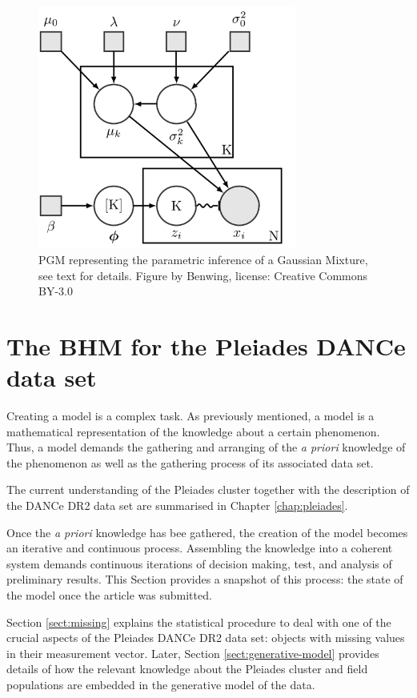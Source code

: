 \begin{figure}[ht!]
\begin{center}
\includegraphics[height=8cm]{background/Figures/BGMM.png}
\caption{PGM representing the parametric inference of a Gaussian Mixture, see text for details. Figure by Benwing, license: Creative Commons BY-3.0}
\label{fig:pgmGMM}
\end{center}
\end{figure}

\section{The BHM for the Pleiades DANCe data set}
\label{sect:datamodelling}
Creating a model is a complex task. As previously mentioned, a model is a mathematical representation of the knowledge about a certain phenomenon. Thus, a model demands the gathering and arranging of the \emph{a priori} knowledge of the phenomenon as well as the gathering process of its associated data set. 

The current understanding of the Pleiades cluster together with the description of the DANCe DR2 data set are summarised in Chapter \ref{chap:pleiades}. 

Once the \emph{a priori} knowledge has bee gathered, the creation of the model becomes an iterative and continuous process. Assembling the knowledge into a coherent system demands continuous iterations of decision making, test, and analysis of preliminary results. This Section provides a snapshot of this process: the state of the model once the article \citet{Olivares2017} was submitted.

Section \ref{sect:missing} explains the statistical procedure to deal with one of the crucial aspects of the Pleiades DANCe DR2 data set: objects with missing values in their measurement vector. Later, Section \ref{sect:generative-model} provides details of how the relevant knowledge about the Pleiades cluster and field populations are embedded in the generative model of the data.
